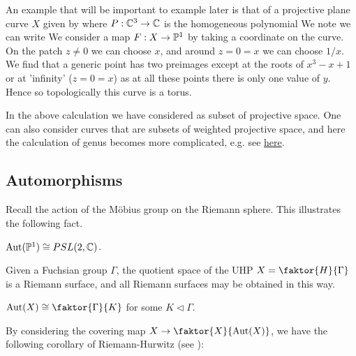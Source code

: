 \documentclass{article}
\begin{document}
\begin{example}
	An example that will be important to example later is that of a projective plane curve $X$ given by 
	where $P: \mathbb{C}^3 \to \mathbb{C}$ is the homogeneous polynomial 
	We note we can write 
	We consider a map $F:X \to \mathbb{P}^1$ by taking a coordinate on the curve. On the patch $z \neq 0$ we can choose $x$, and around $z=0=x$ we can choose $1/x$. We find that a generic point has two preimages except at the roots of $x^3-x+1$ or at 'infinity' ($z=0=x$) as at all these points there is only one value of $y$. Hence 
	so topologically this curve is a torus.
\end{example}

\begin{remark}
	In the above calculation we have considered as subset of projective space. One can also consider curves that are subsets of weighted projective space, and here the calculation of genus becomes more complicated, e.g. see \href{https://mathoverflow.net/questions/160495/genus-in-weighted-projective-space/160519}{here}. 
\end{remark}

\subsection{Automorphisms}
Recall the action of the M\"obius group on the Riemann sphere. This illustrates the following fact. 
\begin{prop}
	$\operatorname{Aut}(\mathbb{P}^1) \cong PSL(2, \mathbb{C})$. 
\end{prop}


\begin{prop}
	Given a Fuchsian group $\Gamma$, the quotient space of the UHP $X=\faktor{H}{\Gamma}$ is a Riemann surface, and all Riemann surfaces may be obtained in this way.
\end{prop}

\begin{prop}
	$\Aut(X) \cong \faktor{\Gamma}{K}$ for some $K \triangleleft \Gamma$.
\end{prop}

By considering the covering map $X \to \faktor{X}{\Aut(X)}$, we have the following corollary of Riemann-Hurwitz (see \cite{Magaard2002}):
\end{document}
